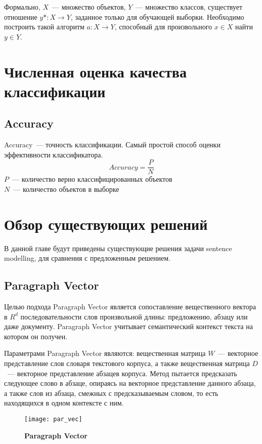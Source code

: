 Формально, $X$~--- множество объектов, $Y$~--- множество классов,
существует отношение $y* : X \rightarrow Y$, заданное только для обучающей выборки.
Необходимо построить такой алгоритм $a: X \rightarrow Y$, способный для произвольного
$x \in X$ найти $y \in Y$.	

\section{Численная оценка качества классификации}

\subsection{Accuracy}
Accuracy~--- точность классификации. Самый простой способ оценки эффективности классификатора.
$$Accuracy =\frac{P}{N}$$
$P$~--- количество верно классифицированных объектов\\
$N$~--- количество объектов в выборке

\section{Обзор существующих решений}

В данной главе будут приведены существующие решения задачи sentence modelling, для сравнения с предложенным решением.

\subsection{Paragraph Vector}


Целью подхода Paragraph Vector является сопоставление вещественного вектора в $R^d$ последовательности слов произвольной длины: предложению, абзацу или даже документу.
Paragraph Vector учитывает семантический контекст текста на котором он получен.

Параметрами Paragraph Vector являются: вещественная матрица $W$~--- векторное представление слов словаря текстового корпуса, а также вещественная матрица $D$~--- векторное представление абзацев корпуса. Метод пытается предсказать следующее слово в абзаце, опираясь на векторное представление данного абзаца, а также слов из абзаца, смежных с предсказываемым словом, то есть находящихся в одном контексте с ним.

\begin{figure}[h]
\texttt{[image: par\_vec]}
\caption{\textbf{Paragraph Vector}}
\label{fig:par_vec}
\end{figure}


